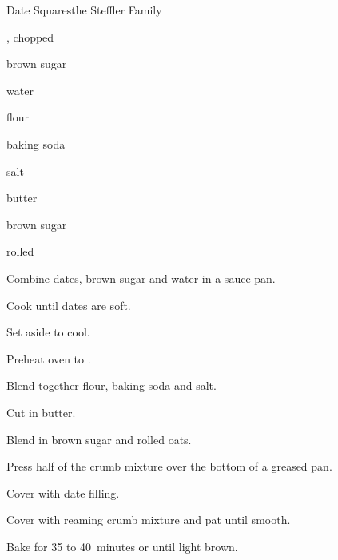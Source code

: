 \begin{recipe}{Date Squares}{the Steffler Family}{}

\begin{ingredients}
\item {} , chopped
\item {} brown sugar
\item {} water
\item {} flour
\item {} baking soda
\item \tp{\quarter} salt
\item {} butter
\item {} brown sugar
\item {} rolled 
\end{ingredients}

\begin{directions}
\item Combine dates, brown sugar and water in a sauce pan.
\item Cook until dates are soft.
\item Set aside to cool.
\item Preheat oven to .
\item Blend together flour, baking soda and salt.
\item Cut in butter.
\item Blend in brown sugar and rolled oats.
\item Press half of the crumb mixture over the bottom of a greased pan.
\item Cover with date filling.
\item Cover with reaming crumb mixture and pat until smooth.
\item Bake for 35 to 40~minutes or until light brown.
\end{directions}
\end{recipe}

